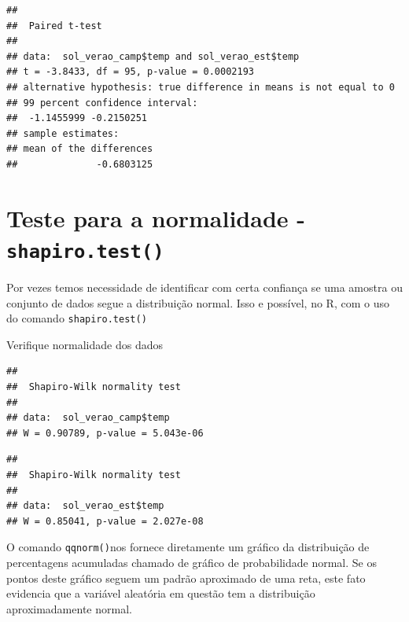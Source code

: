 \documentclass[
]{book}
\newenvironment{Shaded}{\begin{snugshade}}{\end{snugshade}}
\newcommand{\KeywordTok}[1]{\textcolor[rgb]{0.13,0.29,0.53}{\textbf{#1}}}
\newcommand{\NormalTok}[1]{#1}
\newcommand{\OperatorTok}[1]{\textcolor[rgb]{0.81,0.36,0.00}{\textbf{#1}}}
\begin{document}
\begin{verbatim}
## 
##  Paired t-test
## 
## data:  sol_verao_camp$temp and sol_verao_est$temp
## t = -3.8433, df = 95, p-value = 0.0002193
## alternative hypothesis: true difference in means is not equal to 0
## 99 percent confidence interval:
##  -1.1455999 -0.2150251
## sample estimates:
## mean of the differences 
##              -0.6803125
\end{verbatim}

\hypertarget{teste-para-a-normalidade---shapiro.test}{%
\section{\texorpdfstring{Teste para a normalidade - \texttt{shapiro.test()}}{Teste para a normalidade - shapiro.test()}}\label{teste-para-a-normalidade---shapiro.test}}

Por vezes temos necessidade de identificar com certa confiança se uma amostra ou conjunto de dados segue a distribuição normal. Isso e possível, no R, com o uso do comando \texttt{shapiro.test()}

Verifique normalidade dos dados

\begin{Shaded}
\end{Shaded}

\begin{verbatim}
## 
##  Shapiro-Wilk normality test
## 
## data:  sol_verao_camp$temp
## W = 0.90789, p-value = 5.043e-06
\end{verbatim}

\begin{Shaded}
\end{Shaded}

\begin{verbatim}
## 
##  Shapiro-Wilk normality test
## 
## data:  sol_verao_est$temp
## W = 0.85041, p-value = 2.027e-08
\end{verbatim}

O comando \texttt{qqnorm()}nos fornece diretamente um gráfico da distribuição de percentagens
acumuladas chamado de gráfico de probabilidade normal. Se os pontos deste gráfico seguem um padrão aproximado de uma reta, este fato evidencia que a variável aleatória em questão tem a distribuição aproximadamente normal.
\end{document}
